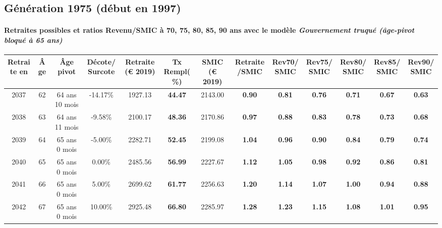 \subsection{Génération 1975 (début en 1997)} 

\paragraph{Retraites possibles et ratios Revenu/SMIC à 70, 75, 80, 85, 90 ans avec le modèle \emph{Gouvernement truqué (âge-pivot bloqué à 65 ans)}}  
 
{ \scriptsize \begin{center} 
\begin{tabular}[htb]{|c|c||c|c||c|c||c||c|c|c|c|c|c|} 
\hline 
 Retraite en &  Âge &  Âge pivot &  Décote/Surcote &  Retraite (\euro{} 2019) &  Tx Rempl(\%) &  SMIC (\euro{} 2019) &  Retraite/SMIC &  Rev70/SMIC &  Rev75/SMIC &  Rev80/SMIC &  Rev85/SMIC &  Rev90/SMIC \\ 
\hline \hline 
 2037 &  62 &  64 ans 10 mois &  -14.17\% &  1927.13 &  {\bf 44.47} &  2143.00 &  {\bf {\color{red} 0.90}} &  {\bf {\color{red} 0.81}} &  {\bf {\color{red} 0.76}} &  {\bf {\color{red} 0.71}} &  {\bf {\color{red} 0.67}} &  {\bf {\color{red} 0.63}} \\ 
\hline 
 2038 &  63 &  64 ans 11 mois &  -9.58\% &  2100.17 &  {\bf 48.36} &  2170.86 &  {\bf {\color{red} 0.97}} &  {\bf {\color{red} 0.88}} &  {\bf {\color{red} 0.83}} &  {\bf {\color{red} 0.78}} &  {\bf {\color{red} 0.73}} &  {\bf {\color{red} 0.68}} \\ 
\hline 
 2039 &  64 &  65 ans 0 mois &  -5.00\% &  2282.71 &  {\bf 52.45} &  2199.08 &  {\bf 1.04} &  {\bf {\color{red} 0.96}} &  {\bf {\color{red} 0.90}} &  {\bf {\color{red} 0.84}} &  {\bf {\color{red} 0.79}} &  {\bf {\color{red} 0.74}} \\ 
\hline 
 2040 &  65 &  65 ans 0 mois &  0.00\% &  2485.56 &  {\bf 56.99} &  2227.67 &  {\bf 1.12} &  {\bf 1.05} &  {\bf {\color{red} 0.98}} &  {\bf {\color{red} 0.92}} &  {\bf {\color{red} 0.86}} &  {\bf {\color{red} 0.81}} \\ 
\hline 
 2041 &  66 &  65 ans 0 mois &  5.00\% &  2699.62 &  {\bf 61.77} &  2256.63 &  {\bf 1.20} &  {\bf 1.14} &  {\bf 1.07} &  {\bf {\color{red} 1.00}} &  {\bf {\color{red} 0.94}} &  {\bf {\color{red} 0.88}} \\ 
\hline 
 2042 &  67 &  65 ans 0 mois &  10.00\% &  2925.48 &  {\bf 66.80} &  2285.97 &  {\bf 1.28} &  {\bf 1.23} &  {\bf 1.15} &  {\bf 1.08} &  {\bf 1.01} &  {\bf {\color{red} 0.95}} \\ 
\hline 
\hline 
\end{tabular} 
\end{center} } 
